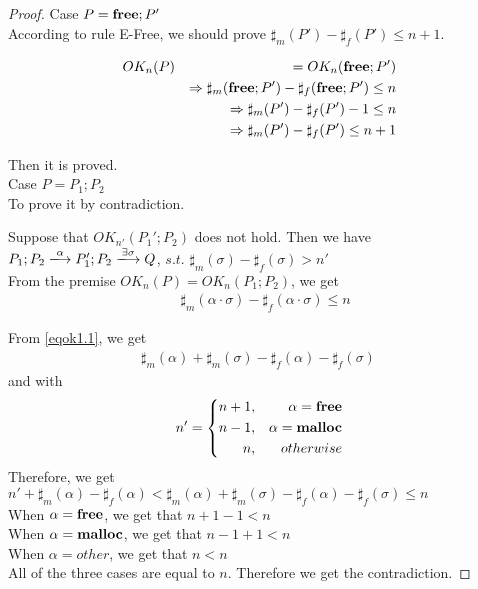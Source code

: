\begin{proof}
\noindent Case $P = \mathbf{free};P'$ \\

According to rule E-Free, we should prove $\sharp_{m}(P') - \sharp_{f}(P') \le n+1$.

\begin{eqnarray*}
  OK_{n}(P)  & & =  OK_{n}(\mathbf{free};P')\\
  & &\Rightarrow  \sharp_{m}(\mathbf{free};P') - \sharp_{f}(\mathbf{free};P') \le n \\
  & & \Rightarrow \sharp_{m}(P')  - \sharp_{f}(P') - 1  \le n\\
  & & \Rightarrow \sharp_{m}(P')  - \sharp_{f}(P') \le n+1\\
\end{eqnarray*}

Then it is proved. \\

\noindent Case $P = P_{1};P_{2}$\\

To prove it by contradiction.

Suppose that $OK_{n'}(P_{1}';P_{2})$ does not hold. Then we have 
$P_{1};P_{2} \xlongrightarrow{\alpha} P_{1}';P_{2} \xlongrightarrow{\exists \sigma} Q$, $s.t.$ $\sharp_{m}(\sigma) - \sharp_{f}(\sigma) > n'$\\

From the premise $OK_{n}(P) = OK_{n}(P_{1};P_{2})$, we get 
\setcounter{equation}{0}
\begin{align}
  &  \sharp_{m}(\alpha \cdot \sigma) - \sharp_{f}(\alpha \cdot \sigma) \le n \label{eqok1.1}
\end{align}

From \eqref{eqok1.1}, we get
\begin{align}
\sharp_{m}(\alpha) + \sharp_{m}(\sigma) - \sharp_{f}(\alpha) - \sharp_{f}(\sigma) \  \label{eqok1.2}
\end{align}
and with
$$
   n'=\left\{
   \begin{aligned}
     n + 1, && \alpha = \mathbf{free} \\
     n - 1,  && \alpha = \mathbf{malloc}  \\
     n ,      && otherwise
   \end{aligned}
   \right.
$$
Therefore, we get \\
$n' + \sharp_{m}(\alpha) - \sharp_{f}(\alpha) < \sharp_{m}(\alpha) + \sharp_{m}(\sigma) - \sharp_{f}(\alpha) - \sharp_{f}(\sigma) \le n $ \\
When $\alpha = \mathbf{free}$, we get that $n + 1 - 1 < n$\\
When $\alpha = \mathbf{malloc}$, we get that $ n - 1 + 1 < n $ \\
When $ \alpha = other$,  we  get that $ n < n $ \\
 All of the three cases are equal to $n$. Therefore we get the contradiction.
\end{proof}

